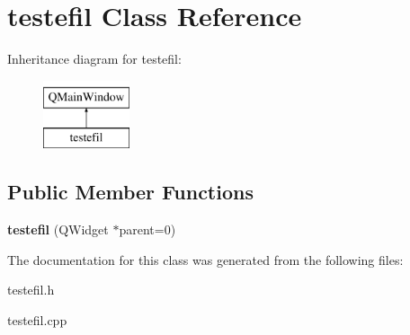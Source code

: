 \hypertarget{classtestefil}{}\section{testefil Class Reference}
\label{classtestefil}
Inheritance diagram for testefil\+:\begin{figure}[H]
\begin{center}
\leavevmode
\includegraphics[height=2.000000cm]{classtestefil}
\end{center}
\end{figure}
\subsection*{Public Member Functions}
\begin{DoxyCompactItemize}
\item 
\mbox{\label{classtestefil_a2a015880b9001b72786477de50cee25b}} 
{\bfseries testefil} (Q\+Widget $\ast$parent=0)
\end{DoxyCompactItemize}


The documentation for this class was generated from the following files\+:\begin{DoxyCompactItemize}
\item 
testefil.\+h\item 
testefil.\+cpp\end{DoxyCompactItemize}
